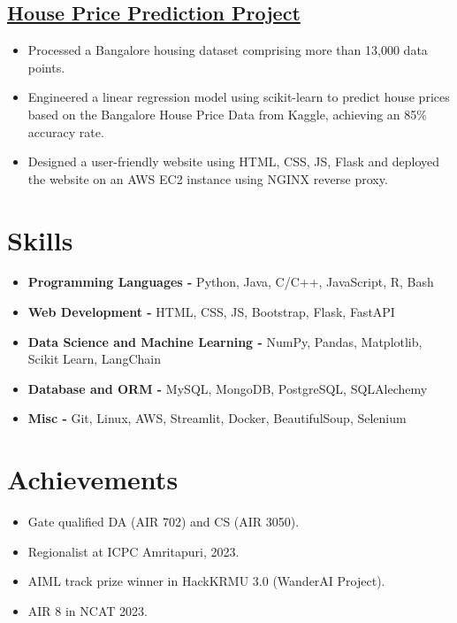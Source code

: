\documentclass[a4paper,11pt]{article}
\begin{document}
\subsection*{\href{https://github.com/kanakOS01/house-prediction-model}{House Price Prediction Project}}
\begin{itemize}[itemsep=0pt,parsep=0pt,topsep=0pt,partopsep=0pt]
    \item Processed a Bangalore housing dataset comprising more than 13,000 data points.
    \item Engineered a linear regression model using scikit-learn to predict house prices based on the Bangalore House Price Data from Kaggle, achieving an 85\% accuracy rate.
    \item Designed a user-friendly website using HTML, CSS, JS, Flask and deployed the website on an AWS EC2 instance using NGINX reverse proxy.
\end{itemize}
\vspace{-5mm}

\section*{Skills}
\vspace{-2mm}
\begin{itemize}
    \item \textbf{Programming Languages -} \small Python, Java, C/C++, JavaScript, R, Bash
    \vspace{-2mm}
    \item \textbf{Web Development -} \small HTML, CSS, JS, Bootstrap, Flask, FastAPI
    \vspace{-2mm}
    \item \textbf{Data Science and Machine Learning -} \small NumPy, Pandas, Matplotlib, Scikit Learn, LangChain
    \vspace{-2mm}
    \item \textbf{Database and ORM -} \small MySQL, MongoDB, PostgreSQL, SQLAlechemy
    \vspace{-2mm}
    \item \textbf{Misc -} \small Git, Linux, AWS, Streamlit, Docker, BeautifulSoup, Selenium
    \vspace{-2mm}
\end{itemize}
\vspace{-5mm}

\section*{Achievements}
\vspace{-2mm}
\begin{itemize}[label=\textbullet, left=0pt, itemsep=0pt,parsep=0pt,topsep=0pt,partopsep=0pt]
    \item Gate qualified DA (AIR 702) and CS (AIR 3050).
    \item Regionalist at ICPC Amritapuri, 2023.
    \item AIML track prize winner in HackKRMU 3.0 (WanderAI Project).
    \item AIR 8 in NCAT 2023.
\end{itemize}
\vspace{-5mm}
\end{document}
